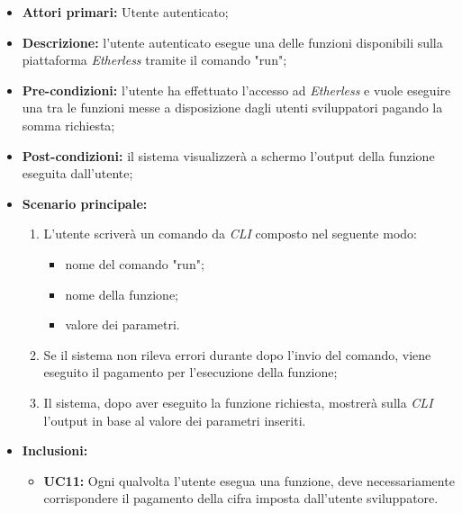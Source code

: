 \begin{itemize}
	\item \textbf{Attori primari:} Utente autenticato;
	\item \textbf{Descrizione:} l'utente autenticato esegue una delle funzioni disponibili sulla piattaforma \textit{Etherless} tramite il comando "run";
	\item \textbf{Pre-condizioni:} l'utente ha effettuato l'accesso ad \textit{Etherless} e vuole eseguire una tra le funzioni messe a disposizione dagli utenti sviluppatori pagando la somma richiesta;
	\item \textbf{Post-condizioni:} il sistema visualizzerà a schermo l'output della funzione eseguita dall'utente;
	\item \textbf{Scenario principale:}
	\begin{enumerate}
		\item L'utente scriverà un comando da \textit{CLI\glo} composto nel seguente modo:
		\begin{itemize}
			\item nome del comando "run";
			\item nome della funzione;
			\item valore dei parametri.
		\end{itemize}
		\item Se il sistema non rileva errori durante dopo l'invio del comando, viene eseguito il pagamento per l'esecuzione della funzione;
		\item Il sistema, dopo aver eseguito la funzione richiesta, mostrerà sulla \textit{CLI\glo} l'output in base al valore dei parametri inseriti.
	\end{enumerate}
	\item \textbf{Inclusioni:}
	\begin{itemize}
		\item \textbf{UC11:} Ogni qualvolta l'utente esegua una funzione, deve necessariamente corrispondere il pagamento della cifra imposta dall'utente sviluppatore.
	\end{itemize}
\end{itemize}
